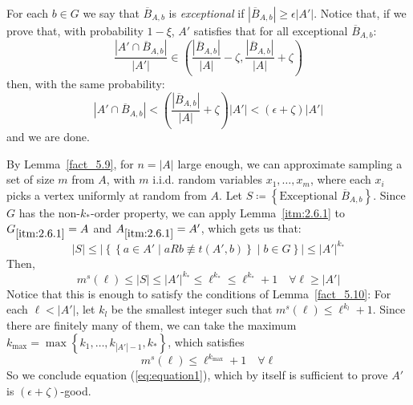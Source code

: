
            \item For each $b \in G$ we say that $\overline{B}_{A,b}$ is \emph{exceptional} if
                $\left| \overline{B}_{A,b} \right| \geq \epsilon \left| A' \right|$.
                Notice that, if we prove that, with probability $1-\xi$, $A'$ satisfies that for all exceptional $\overline{B}_{A,b}$:
                $$
                    \frac{\left| A' \cap \overline{B}_{A,b} \right|}{\left| A' \right|} \in
                         \left( \frac{\left| \overline{B}_{A,b} \right|}{\left| A \right|} -
                         \zeta, \frac{\left| \overline{B}_{A,b} \right|}{\left| A \right|} + \zeta \right)
                $$
                then, with the same probability:
                \begin{equation}\label{eq:equation1}
                    \left| A' \cap \overline{B}_{A,b} \right| < \left( \frac{\left| \overline{B}_{A,b} \right|}{|A|} + \zeta \right) |A'|
                        < \left( \epsilon + \zeta \right) |A'|
                \end{equation}
                and we are done.

                By Lemma~\ref{fact_5.9}, for $n = |A|$ large enough, we can approximate sampling a set of size $m$ from $A$,
                with $m$ i.i.d. random variables $x_1, \dots, x_m$, where each $x_i$ picks a vertex uniformly at random from $A$.
                Let $S \coloneq \left\{ \text{Exceptional } \overline{B}_{A,b} \right\}$.
                Since $G$ has the non-$k_{*}$-order property, we can apply Lemma~\ref{itm:2.6.1} to $G_{\ref{itm:2.6.1}} = A$
                and $A_{\ref{itm:2.6.1}} = A'$, which gets us that:
                $$
                    |S| \leq \left|\left\{ \left\{ a \in A' \mid a R b \not\equiv t(A', b) \right\} \mid b \in G \right\} \right|
                    \leq |A'|^{k_*}
                $$
                Then,
                $$
                    m^s(\ell) \leq \left| S \right| \leq |A'|^{k_*} \leq \ell^{k_*} \leq \ell^{k_{*}} + 1 \quad \forall \ell \geq |A'|
                $$
                Notice that this is enough to satisfy the conditions of Lemma~\ref{fact_5.10}:
                For each $\ell < |A'|$, let $k_l$ be the smallest integer such that $m^s(\ell) \leq \ell^{k_l} + 1$.
                Since there are finitely many of them, we can take the maximum
                $k_{\max} = \max \left\{ k_1, \dots, k_{|A'|-1}, k_* \right\}$, which satisfies
                $$
                    m^s(\ell) \leq \ell^{k_{\max}} + 1 \quad \forall \ell
                $$
                So we conclude equation (\ref{eq:equation1}), which by itself is sufficient to prove $A'$ is
                $(\epsilon + \zeta)$-good.

